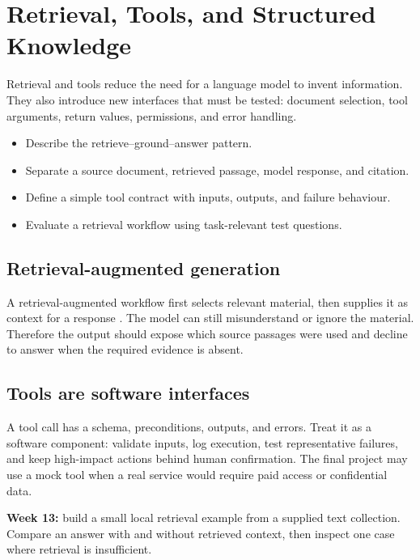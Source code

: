 \chapter{Retrieval, Tools, and Structured Knowledge}\label{chap:retrieval}
 Retrieval and tools reduce the need for a language model to invent information. They also introduce new interfaces that must be tested: document selection, tool arguments, return values, permissions, and error handling.

\begin{learningbox}
\begin{itemize}
  \item Describe the retrieve--ground--answer pattern.
  \item Separate a source document, retrieved passage, model response, and citation.
  \item Define a simple tool contract with inputs, outputs, and failure behaviour.
  \item Evaluate a retrieval workflow using task-relevant test questions.
\end{itemize}
\end{learningbox}

\section{Retrieval-augmented generation}
A retrieval-augmented workflow first selects relevant material, then supplies it as context for a response \citep{lewis2020}. The model can still misunderstand or ignore the material. Therefore the output should expose which source passages were used and decline to answer when the required evidence is absent.

\section{Tools are software interfaces}
A tool call has a schema, preconditions, outputs, and errors. Treat it as a software component: validate inputs, log execution, test representative failures, and keep high-impact actions behind human confirmation. The final project may use a mock tool when a real service would require paid access or confidential data.

\begin{labbox}
\textbf{Week 13:} build a small local retrieval example from a supplied text collection. Compare an answer with and without retrieved context, then inspect one case where retrieval is insufficient.
\end{labbox}
